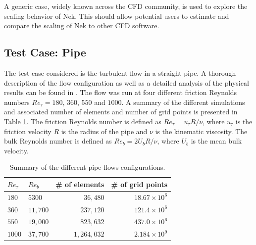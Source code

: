 \documentclass{sig-alternate}
\begin{document}
A generic case, widely known across the CFD community, is used to explore the
scaling behavior of Nek. This should allow potential users to estimate and
compare the scaling of Nek to other CFD software.
\subsection{Test Case: Pipe}
\label{sec:pipe}

The test case considered is the turbulent flow in a straight pipe. A thorough description of the flow configuration as well as a detailed analysis of the physical results can be found in \cite{Khoury2013}. The flow was run at four different friction Reynolds numbers $Re_{\tau} = 180$, $360$, $550$ and $1000$. A summary of the different simulations and associated number of elements and number of grid points is presented in Table \ref{tab:pipe_conf}. The friction Reynolds number is defined as $Re_{\tau} = u_{\tau} R / \nu$, where $u_{\tau}$ is the friction velocity $R$ is the radius of the pipe and  $\nu$ is the kinematic viscosity. The bulk Reynolds number is defined as $Re_{b} = 2 U_b R / \nu$, where $U_b$ is the mean bulk velocity. 

\begin{table}
\centering
\caption{Summary of the different pipe flows configurations.}
\begin{tabular}{llrr} 
\hline
$Re_{\tau}$&$Re_{b}$&\# of elements & \# of grid points\\ 
\hline
$180$ & $5300$ & $36,480$ & $18.67 \times 10^6$\\
$360$ & $11,700$ & $237,120$ & $121.4 \times 10^6$\\ 
$550$ & $19,000$ & $823,632$ & $437.0 \times 10^6$\\ 
$1000$ & $37,700$ & $1,264,032$ & $2.184 \times 10^9$\\
\hline
\end{tabular}
\label{tab:pipe_conf}
\end{table}
\end{document}
